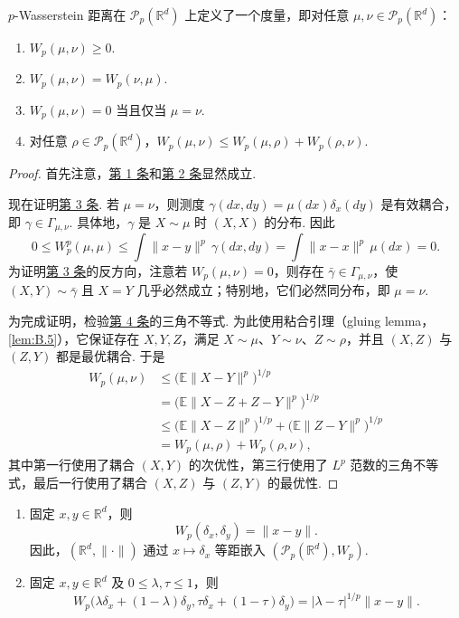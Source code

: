 \begin{proposition}\label{prop:1.3}
$p$-Wasserstein 距离在 $\mathcal P_p(\mathbb R^d)$ 上定义了一个度量，即对任意 $\mu,\nu\in\mathcal P_p(\mathbb R^d)$：
\begin{enumerate}
\item\label{item:1.3.1} $W_p(\mu,\nu)\ge0$.
\item\label{item:1.3.2} $W_p(\mu,\nu)=W_p(\nu,\mu)$.
\item\label{item:1.3.3} $W_p(\mu,\nu)=0$ 当且仅当 $\mu=\nu$.
\item\label{item:1.3.4} 对任意 $\rho\in\mathcal P_p(\mathbb R^d)$，$W_p(\mu,\nu)\le W_p(\mu,\rho)+W_p(\rho,\nu)$.
\end{enumerate}
\end{proposition}
\begin{proof}
首先注意，\hyperref[item:1.3.1]{第 1 条}和\hyperref[item:1.3.2]{第 2 条}显然成立.

现在证明\hyperref[item:1.3.3]{第 3 条}. 若 $\mu=\nu$，则测度 $\gamma(dx,dy)=\mu(dx)\delta_x(dy)$ 是有效耦合，即 $\gamma\in\Gamma_{\mu,\nu}$. 具体地，$\gamma$ 是 $X\sim\mu$ 时 $(X,X)$ 的分布. 因此
$$
0\le W_p^p(\mu,\mu)\le\int\lVert x-y\rVert^p\,\gamma(dx,dy)
=\int\lVert x-x\rVert^p\,\mu(dx)=0.
$$
为证明\hyperref[item:1.3.3]{第 3 条}的反方向，注意若 $W_p(\mu,\nu)=0$，则存在 $\bar\gamma\in\Gamma_{\mu,\nu}$，使 $(X,Y)\sim\bar\gamma$ 且 $X=Y$ 几乎必然成立；特别地，它们必然同分布，即 $\mu=\nu$.

为完成证明，检验\hyperref[item:1.3.4]{第 4 条}的三角不等式. 为此使用粘合引理（gluing lemma，\autoref{lem:B.5}），它保证存在 $X,Y,Z$，满足 $X\sim\mu$、$Y\sim\nu$、$Z\sim\rho$，并且 $(X,Z)$ 与 $(Z,Y)$ 都是最优耦合. 于是
$$
\begin{aligned}
W_p(\mu,\nu)
&\le\bigl(\mathbb E\lVert X-Y\rVert^p\bigr)^{1/p}\\
&=\bigl(\mathbb E\lVert X-Z+Z-Y\rVert^p\bigr)^{1/p}\\
&\le\bigl(\mathbb E\lVert X-Z\rVert^p\bigr)^{1/p}
+\bigl(\mathbb E\lVert Z-Y\rVert^p\bigr)^{1/p}\\
&=W_p(\mu,\rho)+W_p(\rho,\nu),
\end{aligned}
$$
其中第一行使用了耦合 $(X,Y)$ 的次优性，第三行使用了 $L^p$ 范数的三角不等式，最后一行使用了耦合 $(X,Z)$ 与 $(Z,Y)$ 的最优性.
\end{proof}

\begin{example}\label{ex:1.4}\leavevmode
\begin{enumerate}
\item 固定 $x,y\in\mathbb R^d$，则
$$
W_p(\delta_x,\delta_y)=\lVert x-y\rVert.
$$
因此，$(\mathbb R^d,\lVert\cdot\rVert)$ 通过 $x\mapsto\delta_x$ 等距嵌入 $(\mathcal P_p(\mathbb R^d),W_p)$.
\item 固定 $x,y\in\mathbb R^d$ 及 $0\le\lambda,\tau\le1$，则
$$
W_p\bigl(\lambda\delta_x+(1-\lambda)\delta_y,\tau\delta_x+(1-\tau)\delta_y\bigr)
=|\lambda-\tau|^{1/p}\lVert x-y\rVert.
$$
\end{enumerate}
\end{example}

